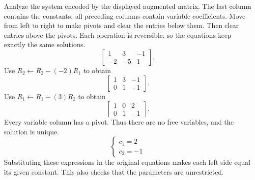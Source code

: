 \goal Analyze the system encoded by the displayed augmented matrix. The last column contains the constants; all preceding columns contain variable coefficients.
\idea Move from left to right to make pivots and clear the entries below them. Then clear entries above the pivots. Each operation is reversible, so the equations keep exactly the same solutions.
\[ \left[\begin{array}{rr|r}1&3&-1\\-2&-5&1\end{array}\right].\]
Use $R_{2}\leftarrow R_{2}-(-2)R_{1}$ to obtain
\[ \left[\begin{array}{rr|r}1&3&-1\\0&1&-1\end{array}\right].\]
Use $R_{1}\leftarrow R_{1}-(3)R_{2}$ to obtain
\[ \left[\begin{array}{rr|r}1&0&2\\0&1&-1\end{array}\right].\]
Every variable column has a pivot. Thus there are no free variables, and the solution is unique.
\[ \begin{cases}c_{1}=2\\c_{2}=-1\end{cases}\]
Substituting these expressions in the original equations makes each left side equal its given constant. This also checks that the parameters are unrestricted.

